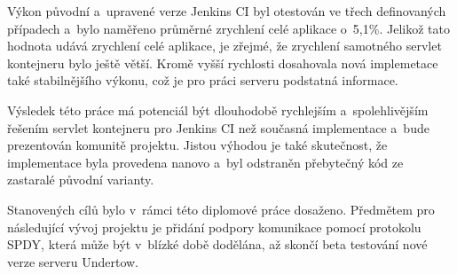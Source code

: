     Výkon původní a~upravené verze Jenkins CI byl otestován ve třech 
    definovaných případech a~bylo naměřeno průměrné zrychlení celé aplikace
    o~5,1\%. 
    Jelikož tato hodnota udává zrychlení celé aplikace, je 
    zřejmé, že zrychlení samotného servlet kontejneru bylo ještě větší.
    Kromě vyšší rychlosti dosahovala nová implemetace také stabilnějšího
    výkonu, což je pro práci serveru podstatná informace.
    
    Výsledek této práce má potenciál být dlouhodobě rychlejším
    a~spolehlivějším řešením servlet kontejneru pro Jenkins CI než současná implementace
    a~bude prezentován komunitě projektu.
    Jistou výhodou je také skutečnost, že implementace byla provedena
    nanovo a~byl odstraněn přebytečný kód ze zastaralé původní varianty.
    
    Stanovených cílů bylo v~rámci této diplomové práce dosaženo.
    Předmětem pro následující vývoj projektu je 
    přidání podpory komunikace pomocí protokolu SPDY, 
    která může být v~blízké době dodělána, až skončí beta testování
    nové verze serveru Undertow.

    







